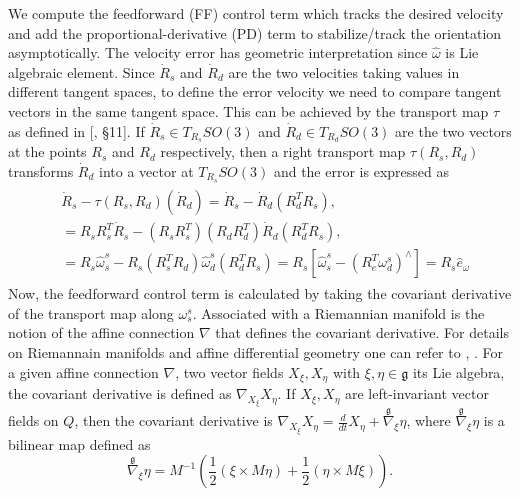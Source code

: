 \documentclass{ifacconf}
\begin{document}
We compute the feedforward (FF) control term which tracks the desired velocity and add the proportional-derivative (PD) term to stabilize/track the orientation asymptotically. The velocity error has geometric interpretation since $\widehat{\omega}$ is Lie algebraic element. Since $\dot{R}_{s}$ and $\dot{R}_{d}$ are the two velocities taking values in different tangent spaces, to define the error velocity we need to compare tangent vectors in the same tangent space. This can be achieved by the transport map $\tau$ as defined in [\citep{book_bullo}, \S 11]. If $\dot{R}_{s} \in T_{R_{s}}SO(3)$ and $\dot{R}_{d} \in T_{R_{d}}SO(3)$ are the two vectors at the points $R_{s}$ and $R_{d}$ respectively, then a right transport map $\tau(R_{s},R_{d})$ transforms $\dot{R}_{d}$ into a vector at $T_{R_{s}}SO(3)$ and the error is expressed as
\begin{align}\nonumber
\begin{split}
& \dot{R}_{s}  - \tau(R_{s},R_{d}) (\dot{R}_{d}) = \dot{R}_{s} - \dot{R}_{d}(R_{d}^{T}R_{s}),\\
& = R_{s}R_{s}^{T} \dot{R}_{s} - (R_{s}R_{s}^{T})(R_{d}R_{d}^{T})\dot{R}_{d}(R_{d}^{T}R_{s}),\\
& = R_{s}\widehat{\omega}_{s}^{s} - R_{s}(R_{s}^{T}R_{d})\widehat{\omega}_{d}^{s}(R_{d}^{T}R_{s})= R_{s}[\widehat{\omega}_{s}^{s} - (R_{e}^{T}\omega_{d}^{s})^{\wedge}] = R_{s}\widehat{e}_{\omega}
\end{split}
\end{align}
Now, the feedforward control term is calculated by taking the covariant derivative of the transport map along $\omega_{s}^{s}$. Associated with a Riemannian manifold is the notion of the affine connection $\nabla$ that defines the covariant derivative. For details on Riemannain manifolds and affine differential geometry one can refer to \citep{do_carmo}, \citep{book_bullo}. For a given affine connection $\nabla$, two vector fields $X_{\xi},X_{\eta}$ with $\xi, \eta \in \mathfrak{g}$ its Lie algebra, the covariant derivative is defined as $\nabla_{X_{\xi}}X_{\eta}$. If $X_{\xi},X_{\eta}$ are left-invariant vector fields on $Q$, then the covariant derivative is $\nabla_{X_{\xi}}X_{\eta} = \frac{d}{dt}X_{\eta} + \overset{\mathfrak{g}}{\nabla}_{\xi}\eta$, 
where $\overset{\mathfrak{g}}{\nabla}_{\xi}\eta$ is a bilinear map defined as 
\begin{equation}\label{covariant}
\overset{\mathfrak{g}}{\nabla}_{\xi}\eta = M^{-1}\left( \frac{1}{2}(\xi \times M\eta) + \frac{1}{2}(\eta \times M\xi) \right). 
\end{equation}
\end{document}

